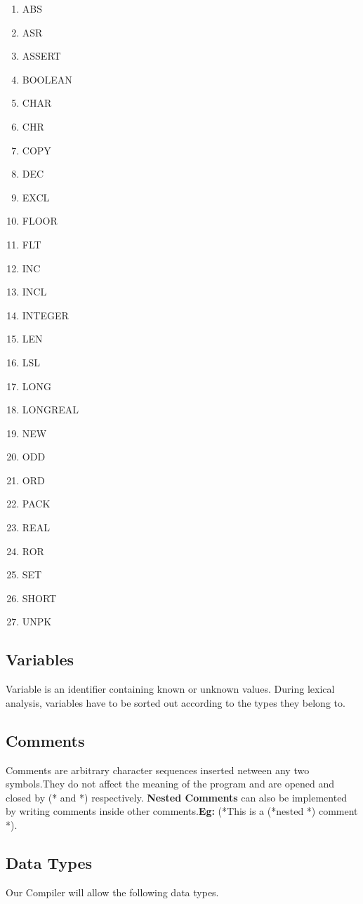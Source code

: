 \documentclass{article}
\begin{document}
\begin{multicols}{4}
\begin{enumerate}
\item ABS 
\item ASR 
\item ASSERT 
\item BOOLEAN 
\item CHAR
\item CHR 
\item COPY 
\item DEC 
\item EXCL 
\item FLOOR
\item FLT 
\item INC 
\item INCL 
\item INTEGER 
\item LEN
\item LSL 
\item LONG 
\item LONGREAL 
\item NEW 
\item ODD
\item ORD 
\item PACK 
\item REAL 
\item ROR 
\item SET
\item SHORT 
\item UNPK
\end{enumerate}
\end{multicols}

\subsection{Variables}
Variable is an identifier containing known or unknown values. During lexical analysis, variables have to be sorted out according to the types they belong to.

\subsection {Comments}
Comments are arbitrary character sequences inserted netween any two symbols.They do not affect the meaning of the program and are opened and closed by (* and *) respectively. {\bf Nested Comments} can also be implemented by writing comments inside other comments.{\bf Eg:} (*This is a (*nested *) comment *).

\subsection {Data Types}
Our Compiler will allow the following data types.
\end{document}
